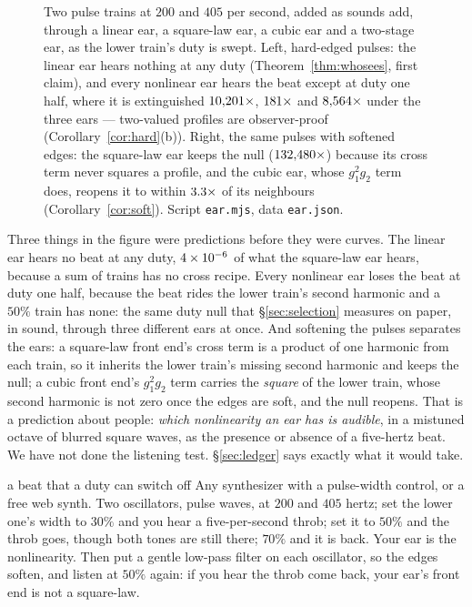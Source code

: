 \begin{figure}[t]
\begin{tikzpicture}
  \end{tikzpicture}
  \caption{ Two pulse trains at
  $200$ and $405$ per second, added as sounds add, through a linear ear, a
  square-law ear, a cubic ear and a two-stage ear, as the lower train's duty
  is swept. Left, hard-edged pulses: the linear ear hears nothing at any
  duty (Theorem~\ref{thm:whosees}, first claim), and every nonlinear ear
  hears the beat except at duty one half, where it is extinguished
  $10{,}201\times$, $181\times$ and
  $8{,}564\times$ under the three ears --- two-valued profiles
  are observer-proof (Corollary~\ref{cor:hard}(b)). Right, the same pulses
  with softened edges: the square-law ear keeps the null
  ($132{,}480\times$) because its cross term never squares a
  profile, and the cubic ear, whose $g_1^2g_2$ term does, reopens it to
  within $3.3\times$ of its neighbours
  (Corollary~\ref{cor:soft}). Script \texttt{ear.mjs}, data
  \texttt{ear.json}.}
  \label{fig:ear}
\end{figure}

Three things in the figure were predictions before they were curves. The
linear ear hears no beat at any duty, $4\times 10^{-6}$ of what the
square-law ear hears, because a sum of trains has no cross recipe. Every
nonlinear ear loses the beat at duty one half, because the beat rides the
lower train's second harmonic and a $50\%$ train has none: the same duty
null that \S\ref{sec:selection} measures on paper, in sound, through three
different ears at once. And softening the pulses separates the ears: a
square-law front end's cross term is a product of one harmonic from each
train, so it inherits the lower train's missing second harmonic and keeps
the null; a cubic front end's $g_1^2g_2$ term carries the \emph{square} of
the lower train, whose second harmonic is not zero once the edges are soft,
and the null reopens. That is a prediction about people: \emph{which
nonlinearity an ear has is audible}, in a mistuned octave of blurred square
waves, as the presence or absence of a five-hertz beat. We have not done the
listening test. \S\ref{sec:ledger} says exactly what it would take.

\begin{tryit}{a beat that a duty can switch off}
Any synthesizer with a pulse-width control, or a free web synth. Two
oscillators, pulse waves, at $200$ and $405$ hertz; set the lower one's
width to $30\%$ and you hear a five-per-second throb; set it to $50\%$ and
the throb goes, though both tones are still there; $70\%$ and it is back.
Your ear is the nonlinearity. Then put a gentle low-pass filter on each
oscillator, so the edges soften, and listen at $50\%$ again: if you hear the
throb come back, your ear's front end is not a square-law.
\end{tryit}
